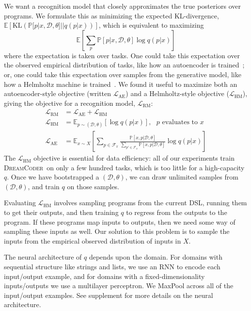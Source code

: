 \documentclass{article}
\newcommand{\system}{\textsc{DreamCoder}~}
\newcommand{\expect}{\mathds{E}} %
\newcommand{\probability}{\mathds{P}} %
\begin{document}
We want a recognition model that closely approximates the true posteriors over programs. We formulate this as minimizing the expected KL-divergence, $  \expect\left[\text{KL}\left(\probability[p|x,\mathcal{D},\theta]||q(p|x) \right) \right]$,
which is equivalent to maximizing
\begin{equation*}
  \expect\left[\sum_p\probability[p|x,\mathcal{D},\theta]\log q(p|x) \right]
\end{equation*}
where the expectation is taken over tasks. One could take this expectation
over the observed empirical distribution of tasks,
like how an autoencoder is trained~\cite{hinton2006reducing}; or, one could take this expectation over samples from the generative model, like how a Helmholtz machine is trained~\cite{dayan1995helmholtz}.
We found it useful to maximize both an autoencoder-style objective (written $\mathcal{L}_{\text{AE}}$) and a Helmholtz-style objective ($\mathcal{L}_{\text{HM}}$), giving the  objective for a recognition model, $\mathcal{L}_{\text{RM}}$:
\begin{align}
\mathcal{L}_{\text{RM}}& = \mathcal{L}_\text{AE} + \mathcal{L}_\text{HM}\\
\mathcal{L}_{\text{HM}}& = \expect_{p\sim(\mathcal{D},\theta) }\left[\log q(p|x)\right],\text{ $p$ evaluates to $x$}\nonumber\\
\mathcal{L}_{\text{AE}}& = \expect_{x\sim X}\left[\sum_{p\in \mathcal{F}_x}
  \frac{\probability\left[x,p|\mathcal{D},\theta \right]}{\sum_{p'\in \mathcal{F}_x}\probability\left[x,p|\mathcal{D},\theta \right]}\log q(p|x)\right]\nonumber
\end{align}
The $\mathcal{L}_{\text{HM}}$ objective is essential for data efficiency:
all of our experiments train \system on only a few hundred tasks, which is too little for
a high-capacity $q$.
Once we have bootstrapped a $(\mathcal{D},\theta)$,
we can draw unlimited samples from $(\mathcal{D},\theta)$,
and train $q$ on those samples.

Evaluating $\mathcal{L}_{\text{HM}}$ involves sampling programs from
the current DSL, running them to get their outputs,
and then training $q$ to regress from the outputs to the program.
If these programs map inputs to outputs,
then we need some way of sampling these inputs as well.
Our solution to this problem is to sample the inputs
from the empirical observed distribution of inputs in $X$.

The neural architecture of $q$ depends upon the domain.
For domains with sequential structure like strings and lists,
we use an RNN to encode each input/output example,
and for domains with a fixed-dimensionality inputs/outputs we use a multilayer perceptron.
We MaxPool across all of the input/output examples. See supplement for more details on the neural architecture.
\end{document}
